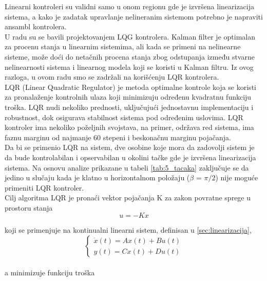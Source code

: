 \documentclass[a4paper,11pt]{article}
\theoremstyle{definition} \newtheorem{deff}{Definicija}[section]
\theoremstyle{definition} \newtheorem{prim}[deff]{Primer}
\theoremstyle{plain} \newtheorem{teor}[deff]{Teorema}
\begin{document}
	Linearni kontroleri su validni samo u onom regionu gde je izvršena linearizacija sistema, a kako je zadatak upravlanje nelineranim sistemom potrebno je napraviti ansambl kontrolera. \\
	
	U radu \cite{inicijalna} su se bavili projektovanjem LQG kontrolera. Kalman filter je optimalan za procenu stanja u linearnim sistemima, ali kada se primeni na nelinearne sisteme, može doći do netačnih procena stanja zbog odstupanja između stvarne nelinearnosti sistema i linearnog modela koji se koristi u Kalman filtru. Iz ovog razloga, u ovom radu smo se zadržali na korišćenju LQR kontrolera. \\
	
	LQR (Linear Quadratic Regulator) je metoda optimalne kontrole koja se koristi za pronalaženje kontrolnih ulaza koji minimizuju određenu kvadratnu funkciju troška. LQR nudi nekoliko prednosti, uključujući jednostavnu implementaciju i robustnost, dok osigurava stabilnost sistema pod određenim uslovima. LQR kontroler ima nekoliko poželjnih svojstava, na primer, održava red sistema, ima faznu marginu od najmanje 60 stepeni i beskonačnu marginu pojačanja.\\
	
	Da bi se primenio LQR na sistem, dve osobine koje mora da zadovolji sistem je da bude kontrolabilan i opservabilan u okolini tačke gde je izvršena linearizacija sistema. Na osnovu analize prikazane u tabeli \ref{tab:5_tacaka} zaključuje se da jedino u slučaju kada je klatno u horizontalnom položaju ($\beta$ = $\pi /2$) nije moguće primeniti LQR kontroler.\\
	
	
	Cilj algoritma LQR je pronaći vektor pojačanja K za zakon povratne sprege u prostoru stanja
	\begin{equation}
		u = -Kx 
	\end{equation}
	
	koji se primenjuje na kontinualni linearni sistem, definisan u \ref{sec:linearizacija}, \\
	
	\begin{equation}
		\begin{cases}
			\dot{x}(t) = Ax(t) + Bu(t) \\
			y(t) = Cx(t) + Du(t)
		\end{cases}
	\end{equation}\\
	
	a minimizuje funkciju troška\\
	
\end{document}
